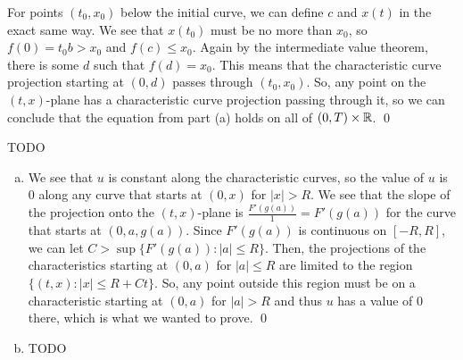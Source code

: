 \documentclass{article}
\begin{document}
\begin{enumerate}
    \hop 
    For points $(t_0, x_0)$ below the initial curve, we can define $c$ and $x(t)$ in the exact same way. We see that $x(t_0)$ must be no more than $x_0$, so $f(0) = t_0b > x_0$ and $f(c) \le x_0$. Again by the intermediate value theorem, there is some $d$ such that $f(d) = x_0$. This means that the characteristic curve projection starting at $(0,d)$ passes through $(t_0,x_0)$. 
    \hop 
    So, any point on the $(t,x)$-plane has a characteristic curve projection passing through it, so we can conclude that the equation from part (a) holds on all of $(0,T) \times \mathbb{R}$. \qed
\end{enumerate}


\newpage
{} TODO
\hop
\solution
\begin{enumerate}[(a)]
    \item We see that $u$ is constant along the characteristic curves, so the value of $u$ is $0$ along any curve that starts at $(0,x)$ for $|x| > R$. We see that the slope of the projection onto the $(t,x)$-plane is $\frac{F'(g(a))}{1} = F'(g(a))$ for the curve that starts at $(0, a, g(a))$. Since $F'(g(a))$ is continuous on $[-R, R]$, we can let $C > \sup \{F'(g(a)) : |a| \le R \}$. Then, the projections of the characteristics starting at $(0,a)$ for $|a| \le R$ are limited to the region $\{(t,x): |x| \le R+Ct\}$. So, any point outside this region must be on a characteristic starting at  $(0,a)$ for $|a| > R$ and thus $u$ has a value of 0 there, which is what we wanted to prove. \qed 
    \item TODO
\end{enumerate}
\end{document}
